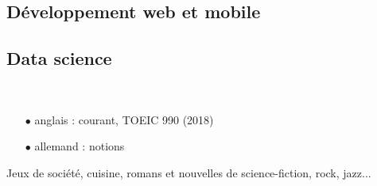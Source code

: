 \documentclass{cv}
\begin{document}
\noindent\begin{minipage}[t]{0.6\textwidth}

\subsection*{Développement web et mobile}

         

\end{minipage}\hspace{.5cm}
\begin{minipage}[t]{0.3\textwidth}

\subsection*{Data science}

   

\end{minipage}

\paragraph{}\,

\noindent\begin{minipage}[t]{0.6\textwidth}


\begin{itemize}
\setlength\itemsep{0pt}
\item[$\bullet$] anglais : courant, TOEIC 990 (2018)
\item[$\bullet$] allemand : notions
\end{itemize}

\end{minipage}\hspace{.5cm}
\begin{minipage}[t]{0.3\textwidth}


Jeux de société, cuisine, romans et nouvelles de science-fiction, rock, jazz...

\end{minipage}
\end{document}
